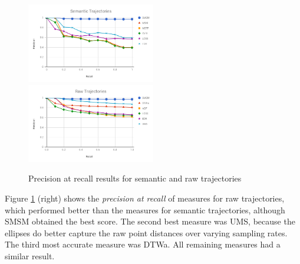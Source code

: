 \documentclass[12pt]{article}
\begin{document}
\begin{figure}[ht!]
\centering
\centerline{
\includegraphics[width=0.5\textwidth]{Images/P_R-chart_San_Francisco.png}
\includegraphics[width=0.5\textwidth]{Images/P_R-chart_San_Francisco-raw.png}
}
\caption{ Precision at recall results for semantic and raw trajectories}
\label{fig:sanfrancisco_precision_recall}
\end{figure}



{Figure {\ref{fig:sanfrancisco_precision_recall}} (right) shows the \emph{precision at recall} of measures for raw trajectories, which performed better than the measures for semantic trajectories, although SMSM obtained the best score. The second best measure was UMS, because the ellipses do better capture the raw point distances over varying sampling rates. The third most accurate measure was DTWa.  
All remaining measures had a similar result. 
}
\end{document}
